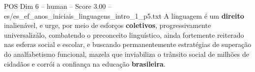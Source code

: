 \begin{textsample}{POS Dim 6 – human – Score 3.00 – es/es\_ef\_anos\_iniciais\_linguagens\_intro\_1\_p5.txt}  \label{ex:f6_pos_018}
A linguagem é um \textbf{direito} inalienável, e urge, por meio de esforços \textbf{coletivos}, progressivamente universalizálo, combatendo o preconceito linguístico, ainda fortemente reiterado nas esferas social e escolar, e buscando permanentemente estratégias de superação do analfabetismo funcional, mazela que inviabiliza o trânsito social de milhões de cidadãos e corrói a confiança na educação \textbf{brasileira}.

\end{textsample}
